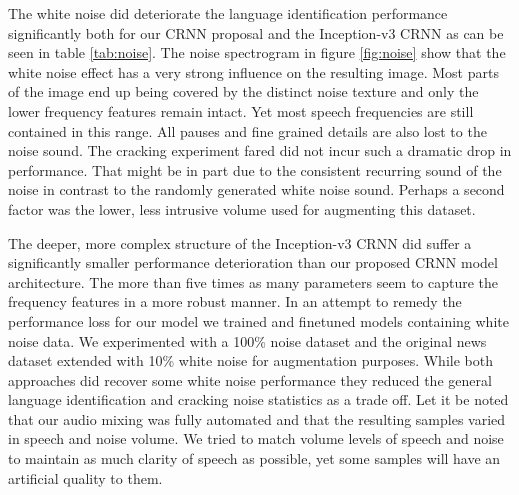 The white noise did deteriorate the language identification performance significantly both for our CRNN proposal and the Inception-v3 CRNN as can be seen in table \ref{tab:noise}. The noise spectrogram in figure \ref{fig:noise} show that the white noise effect has a very strong influence on the resulting image. Most parts of the image end up being covered by the distinct noise texture and only the lower frequency features remain intact. Yet most speech frequencies are still contained in this range. All pauses and fine grained details are also lost to the noise sound. The cracking experiment fared did not incur such a dramatic drop in performance. That might be in part due to the consistent recurring sound of the noise in contrast to the randomly generated white noise sound. Perhaps a second factor was the lower, less intrusive volume used for augmenting this dataset.

The deeper, more complex structure of the Inception-v3 CRNN did suffer a significantly smaller performance deterioration than our proposed CRNN model architecture. The more than five times as many parameters seem to capture the frequency features in a more robust manner. In an attempt to remedy the performance loss for our model we trained and finetuned models containing white noise data. We experimented with a 100\% noise dataset and the original news dataset extended with 10\% white noise for augmentation purposes. While both approaches did recover some white noise performance they reduced the general language identification and cracking noise statistics as a trade off.
Let it be noted that our audio mixing was fully automated and that the resulting samples varied in speech and noise volume. We tried to match volume levels of speech and noise to maintain as much clarity of speech as possible, yet some samples will have an artificial quality to them.

